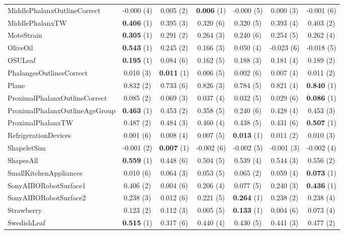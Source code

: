 \begin{table}[ht]
\begin{adjustbox}{width=\textwidth}
\begin{tabular}{lcccccc}
    MiddlePhalanxOutlineCorrect & -0.000 (4) & 0.005 (2) & \textbf{0.006} (1) & -0.000 (5) & 0.000 (3) & -0.001 (6) \\
    MiddlePhalanxTW & \textbf{0.406} (1) & 0.395 (3) & 0.320 (6) & 0.320 (5) & 0.393 (4) & 0.403 (2) \\
    MoteStrain & \textbf{0.305} (1) & 0.291 (2) & 0.264 (3) & 0.240 (6) & 0.254 (5) & 0.262 (4) \\
    OliveOil & \textbf{0.543} (1) & 0.245 (2) & 0.166 (3) & 0.050 (4) & -0.023 (6) & -0.018 (5) \\
    OSULeaf & \textbf{0.195} (1) & 0.084 (6) & 0.162 (5) & 0.188 (3) & 0.181 (4) & 0.189 (2) \\
    PhalangesOutlinesCorrect & 0.010 (3) & \textbf{0.011} (1) & 0.006 (5) & 0.002 (6) & 0.007 (4) & 0.011 (2) \\
    Plane & 0.832 (2) & 0.733 (6) & 0.826 (3) & 0.784 (5) & 0.821 (4) & \textbf{0.840} (1) \\
    ProximalPhalanxOutlineCorrect & 0.085 (2) & 0.069 (3) & 0.037 (4) & 0.032 (5) & 0.029 (6) & \textbf{0.086} (1) \\
    ProximalPhalanxOutlineAgeGroup & \textbf{0.463} (1) & 0.453 (2) & 0.358 (5) & 0.240 (6) & 0.428 (4) & 0.453 (3) \\
    ProximalPhalanxTW & 0.487 (2) & 0.484 (3) & 0.460 (4) & 0.438 (5) & 0.431 (6) & \textbf{0.507} (1) \\
    RefrigerationDevices & 0.001 (6) & 0.008 (4) & 0.007 (5) & \textbf{0.013} (1) & 0.011 (2) & 0.010 (3) \\
    ShapeletSim & -0.001 (2) & \textbf{0.007} (1) & -0.002 (6) & -0.002 (5) & -0.001 (3) & -0.002 (4) \\
    ShapesAll & \textbf{0.559} (1) & 0.448 (6) & 0.504 (5) & 0.539 (4) & 0.544 (3) & 0.556 (2) \\
    SmallKitchenAppliances & 0.010 (6) & 0.064 (3) & 0.053 (5) & 0.065 (2) & 0.059 (4) & \textbf{0.073} (1) \\
    SonyAIBORobotSurface1 & 0.406 (2) & 0.004 (6) & 0.206 (4) & 0.077 (5) & 0.240 (3) & \textbf{0.436} (1) \\
    SonyAIBORobotSurface2 & 0.238 (3) & 0.012 (6) & 0.221 (5) & \textbf{0.264} (1) & 0.238 (2) & 0.238 (4) \\
    Strawberry & 0.123 (2) & 0.112 (3) & 0.005 (5) & \textbf{0.133} (1) & 0.004 (6) & 0.073 (4) \\
    SwedishLeaf & \textbf{0.515} (1) & 0.317 (6) & 0.440 (4) & 0.430 (5) & 0.441 (3) & 0.477 (2) \\

\end{tabular}
\end{adjustbox}
\end{table}
